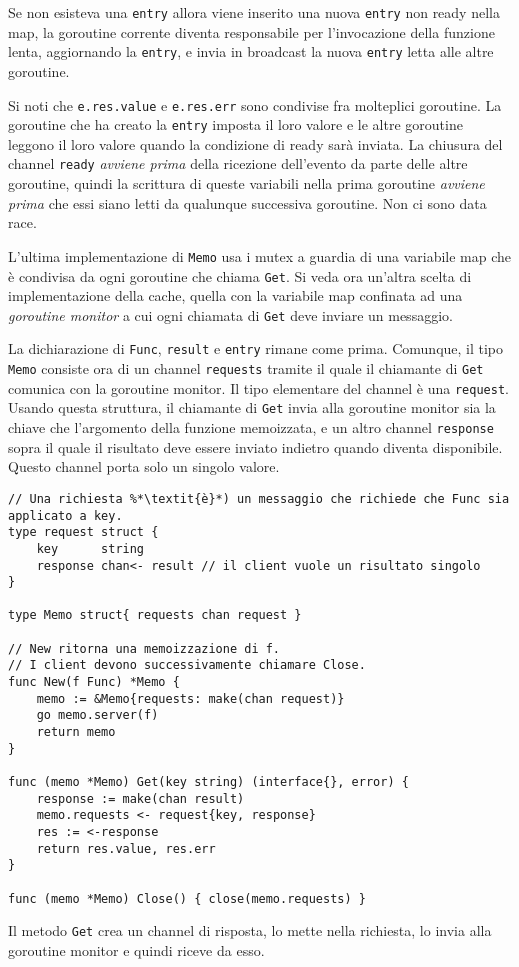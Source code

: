 \documentclass[../../thesis.tex]{subfiles}
\begin{document}
    Se non esisteva una \verb"entry" allora viene inserito una nuova \verb"entry" non ready nella map, la goroutine corrente diventa responsabile per l'invocazione della funzione lenta, aggiornando la \verb"entry", e invia in broadcast la nuova \verb"entry" letta alle altre goroutine.
    \hfill \vspace{12pt}

    Si noti che \verb"e.res.value" e \verb"e.res.err" sono condivise fra molteplici goroutine.
    La goroutine che ha creato la \verb"entry" imposta il loro valore e le altre goroutine leggono il loro valore quando la condizione di ready sarà inviata.
    La chiusura del channel \verb"ready" \textit{avviene prima} della ricezione dell'evento da parte delle altre goroutine, quindi la scrittura di queste variabili nella prima goroutine \textit{avviene prima} che essi siano letti da qualunque successiva goroutine.
    Non ci sono data race.
    \hfill \vspace{12pt}

    L'ultima implementazione di \verb"Memo" usa i mutex a guardia di una variabile map che è condivisa da ogni goroutine che chiama \verb"Get".
    \clearpage
    \newpage
    Si veda ora un'altra scelta di implementazione della cache, quella con la variabile map confinata ad una \textit{goroutine monitor} a cui ogni chiamata di \verb"Get" deve inviare un messaggio.
    \hfill \vspace{12pt}

    La dichiarazione di \verb"Func", \verb"result" e \verb"entry" rimane come prima.
    Comunque, il tipo \verb"Memo" consiste ora di un channel \verb"requests" tramite il quale il chiamante di \verb"Get" comunica con la goroutine monitor.
    Il tipo elementare del channel è una \verb"request".
    Usando questa struttura, il chiamante di \verb"Get" invia alla goroutine monitor sia la chiave che l'argomento della funzione memoizzata, e un altro channel \verb"response" sopra il quale il risultato deve essere inviato indietro quando diventa disponibile.
    Questo channel porta solo un singolo valore.
    \begin{lstlisting}[frame = single, label = {lst:lstlisting9-7.10}]
// Una richiesta %*\textit{è}*) un messaggio che richiede che Func sia applicato a key.
type request struct {
    key      string
    response chan<- result // il client vuole un risultato singolo
}

type Memo struct{ requests chan request }

// New ritorna una memoizzazione di f.
// I client devono successivamente chiamare Close.
func New(f Func) *Memo {
    memo := &Memo{requests: make(chan request)}
    go memo.server(f)
    return memo
}

func (memo *Memo) Get(key string) (interface{}, error) {
    response := make(chan result)
    memo.requests <- request{key, response}
    res := <-response
    return res.value, res.err
}

func (memo *Memo) Close() { close(memo.requests) }
    \end{lstlisting}
    Il metodo \verb"Get" crea un channel di risposta, lo mette nella richiesta, lo invia alla goroutine monitor e quindi riceve da esso.
    \hfill \vspace{12pt}
\end{document}
